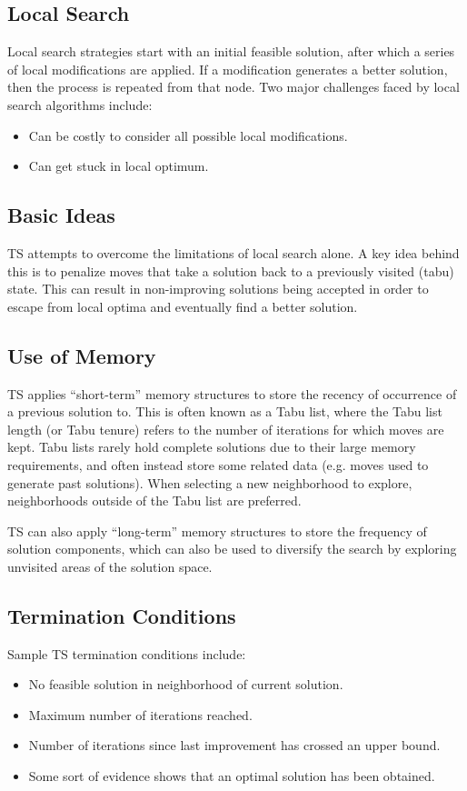 \documentclass[12pt,titlepage]{article}
\begin{document}
    \subsection{Local Search}
      Local search strategies start with an initial feasible solution, after which a series of local modifications are applied. If a modification generates a better solution,
      then the process is repeated from that node. Two major challenges faced by local search algorithms include:
      \begin{itemize}
        \item Can be costly to consider all possible local modifications. 
        \item Can get stuck in local optimum.
      \end{itemize}

    \subsection{Basic Ideas}
      TS attempts to overcome the limitations of local search alone. A key idea behind this is to penalize moves that take a solution back to a previously visited (tabu) state.
      This can result in non-improving solutions being accepted in order to escape from local optima and eventually find a better solution.

    \subsection{Use of Memory}
      TS applies ``short-term'' memory structures to store the recency of occurrence of a previous solution to. This is often known as a Tabu list, where the Tabu list length
      (or Tabu tenure) refers to the number of iterations for which moves are kept. Tabu lists rarely hold complete solutions due to their large memory requirements, and often
      instead store some related data (e.g. moves used to generate past solutions). When selecting a new neighborhood to explore, neighborhoods outside of the Tabu list are preferred.

      TS can also apply ``long-term'' memory structures to store the frequency of solution components, which can also be used to diversify the search by exploring unvisited
      areas of the solution space.

    \subsection{Termination Conditions}
      Sample TS termination conditions include:
      \begin{itemize}
        \item No feasible solution in neighborhood of current solution.
        \item Maximum number of iterations reached.
        \item Number of iterations since last improvement has crossed an upper bound.
        \item Some sort of evidence shows that an optimal solution has been obtained.
      \end{itemize}
\end{document}
